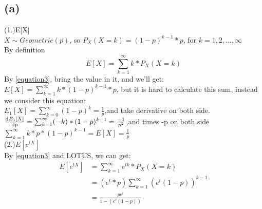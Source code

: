 \documentclass[a4paper,11pt]{article} %
\begin{document}
\subsection{(a)}
(1.)E[X]\\
$X \sim Geometric(p)$, so $P_X(X=k)=(1-p)^{k-1}*p$, for $k=1,2,\dots ,\infty$\\
By definition\\
\begin{equation}
\label{equation3}
    E[X]=\sum_{k=1}^{\infty}k*P_X(X=k)
\end{equation}
By \eqref{equation3}, bring the value in it, and we'll get:\\
$E[X]=\sum_{k=1}^{\infty}k*(1-p)^{k-1}*p$, but it is hard to calculate this sum, instead we consider this equation:\\
$E_1[X]=\sum_{k=0}^{\infty}(1-p)^k=\frac{1}{p}$,and take derivative on both side.\\
$\odv{E_1[X]}{p}=\sum_{k=1}^{\infty}(-k)*(1-p)^{k-1}=\frac{-1}{p^2}$,and times -p on both side\\
$\sum_{k=1}^{\infty}k*p*(1-p)^{k-1}=E[X]=\frac{1}{p}$\\
(2.)$E[e^{tX}]$\\
By \eqref{equation3} and LOTUS, we can get:\\
\begin{align*}
    E[e^{tX}]&=\sum_{k=1}^{\infty}e^{tk}*P_X(X=k)\\
             &=(e^t*p)\sum_{k=1}^{\infty}(e^t(1-p))^{k-1}\\
             &=\frac{pe^t}{1-(e^t(1-p))}
\end{align*}
\end{document}
